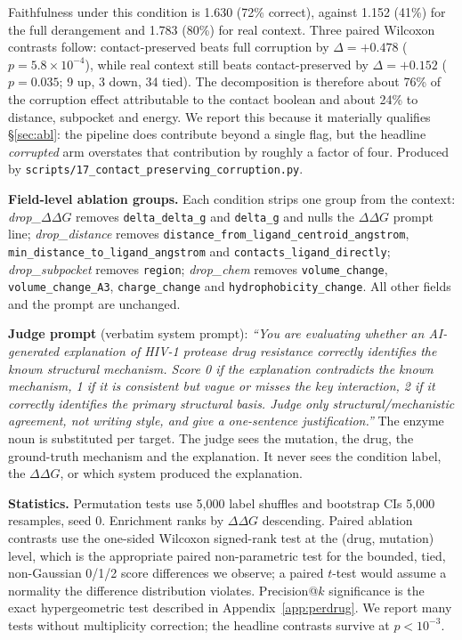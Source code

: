 \documentclass{article}
\newcommand{\ddg}{\ensuremath{\Delta\Delta G}}
\begin{document}
Faithfulness under this condition is 1.630 (72\% correct), against 1.152 (41\%)
for the full derangement and 1.783 (80\%) for real context. Three paired
Wilcoxon contrasts follow: contact-preserved beats full corruption by
$\Delta=+0.478$ ($p=5.8\times10^{-4}$), while real context still beats
contact-preserved by $\Delta=+0.152$ ($p=0.035$; 9 up, 3 down, 34 tied). The
decomposition is therefore about 76\% of the corruption effect attributable to
the contact boolean and about 24\% to distance, subpocket and energy. We report
this because it materially qualifies \S\ref{sec:abl}: the pipeline does
contribute beyond a single flag, but the headline \emph{corrupted} arm overstates
that contribution by roughly a factor of four. Produced by
\texttt{scripts/17\_contact\_preserving\_corruption.py}.

\textbf{Field-level ablation groups.} Each condition strips one group from the
context: \emph{drop\_\ddg} removes \texttt{delta\_delta\_g} and \texttt{delta\_g}
and nulls the \ddg{} prompt line; \emph{drop\_distance} removes
\texttt{distance\_from\_ligand\_centroid\_angstrom},
\texttt{min\_distance\_to\_ligand\_angstrom} and
\texttt{contacts\_ligand\_directly}; \emph{drop\_subpocket} removes
\texttt{region}; \emph{drop\_chem} removes \texttt{volume\_change},
\texttt{volume\_change\_A3}, \texttt{charge\_change} and
\texttt{hydrophobicity\_change}. All other fields and the prompt are unchanged.

\textbf{Judge prompt} (verbatim system prompt): \emph{``You are evaluating whether
an AI-generated explanation of HIV-1 protease drug resistance correctly identifies
the known structural mechanism. Score 0 if the explanation contradicts the known
mechanism, 1 if it is consistent but vague or misses the key interaction, 2 if it
correctly identifies the primary structural basis. Judge only structural/mechanistic
agreement, not writing style, and give a one-sentence justification.''} The enzyme
noun is substituted per target. The judge sees the mutation, the drug, the
ground-truth mechanism and the explanation. It never sees the condition label, the
\ddg, or which system produced the explanation.

\textbf{Statistics.} Permutation tests use 5{,}000 label shuffles and bootstrap
CIs 5{,}000 resamples, seed 0. Enrichment ranks by \ddg{} descending. Paired
ablation contrasts use the one-sided Wilcoxon signed-rank test at the
(drug, mutation) level, which is the appropriate paired non-parametric test for
the bounded, tied, non-Gaussian 0/1/2 score differences we observe; a paired
$t$-test would assume a normality the difference distribution violates.
Precision@$k$ significance is the exact hypergeometric test described in
Appendix~\ref{app:perdrug}. We report many tests without multiplicity correction;
the headline contrasts survive at $p<10^{-3}$.
\end{document}
